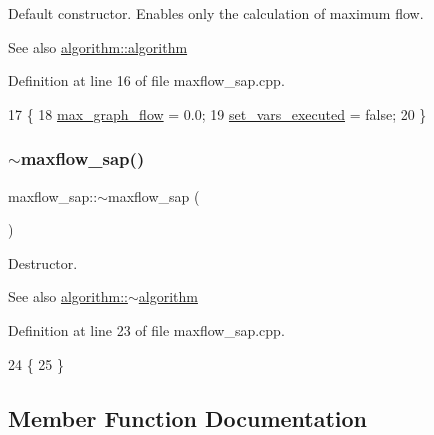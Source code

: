 Default constructor. Enables only the calculation of maximum flow.

\begin{DoxySeeAlso}{See also}
\mbox{\hyperlink{classalgorithm_ab79e1ddec2f2afdf4b36b10724db8b15}{algorithm\+::algorithm}} 
\end{DoxySeeAlso}


Definition at line 16 of file maxflow\+\_\+sap.\+cpp.


\begin{DoxyCode}
17 \{
18     \mbox{\hyperlink{classmaxflow__sap_a77c650fd11632352a1228f2cbd38caf1}{max\_graph\_flow}} = 0.0;
19     \mbox{\hyperlink{classmaxflow__sap_aad7f764b9e9732b996f402ffadbf5b70}{set\_vars\_executed}} = \textcolor{keyword}{false};
20 \}
\end{DoxyCode}
\mbox{\label{classmaxflow__sap_ab49914afde43ffa0e5c3049cc063a8d2}} 
\subsubsection{\texorpdfstring{$\sim$maxflow\+\_\+sap()}{~maxflow\_sap()}}
{\footnotesize\ttfamily maxflow\+\_\+sap\+::$\sim$maxflow\+\_\+sap (\begin{DoxyParamCaption}{ }\end{DoxyParamCaption})\hspace{0.3cm}{\ttfamily [virtual]}}

Destructor.

\begin{DoxySeeAlso}{See also}
\mbox{\hyperlink{classalgorithm_adca9b1e7fa3afd914519a9dbb44e9fd5}{algorithm\+::$\sim$algorithm}} 
\end{DoxySeeAlso}


Definition at line 23 of file maxflow\+\_\+sap.\+cpp.


\begin{DoxyCode}
24 \{
25 \}
\end{DoxyCode}


\subsection{Member Function Documentation}
\mbox{\label{classmaxflow__sap_a0eb02b00fa0840cfad87eb6d67c9b849}} 
